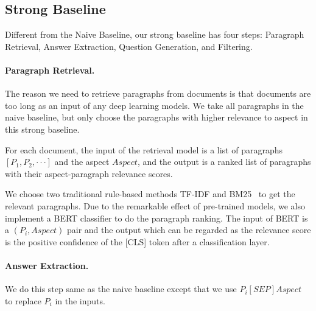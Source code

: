 

\subsection{Strong Baseline}
Different from the Naive Baseline, our strong baseline has four steps: Paragraph Retrieval, Answer Extraction, Question Generation, and Filtering.
\paragraph{Paragraph Retrieval.} The reason we need to retrieve paragraphs from documents is that documents are too long as an input of any deep learning models. We take all paragraphs in the naive baseline, but only choose the paragraphs with higher relevance to aspect in this strong baseline.

For each document, the input of the retrieval model is a list of paragraphs $[P_1, P_2, \cdot\cdot\cdot]$ and the aspect $Aspect$, and the output is a ranked list of paragraphs with their aspect-paragraph relevance scores.

We choose two traditional rule-based methods TF-IDF and BM25~\cite{robertson2009probabilistic} to get the relevant paragraphs.
Due to the remarkable effect of pre-trained models, we also implement a BERT classifier to do the paragraph ranking\cite{qiao2019understanding}.
The input of BERT is a $(P_i, Aspect)$ pair and the output which can be regarded as the relevance score is the positive confidence of the [CLS] token after a classification layer.

\paragraph{Answer Extraction. } We do this step same as the naive baseline except that we use $P_i[SEP]Aspect$ to replace $P_i$ in the inputs.

